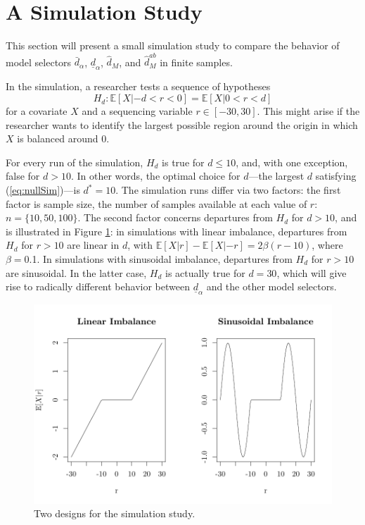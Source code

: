 \documentclass[12pt]{article}\usepackage[]{graphicx}\usepackage[]{color}
\makeatletter
\def\maxwidth{ %
  \ifdim\Gin@nat@width>\linewidth
    \linewidth
  \else
    \Gin@nat@width
  \fi
}
\newcommand{\dalphaU}{\bar{d}_\alpha}
\newcommand{\dalphaB}{\underline{d}_\alpha}
\newcommand{\dstar}{d^*}
\newcommand{\dhatm}{\hat{d}_M}
\newcommand{\dhatmab}{\hat{d}^{ab}_M}
\newcommand{\EE}{\mathbb{E}}
\makeatother
\begin{document}
\section{A Simulation Study}\label{sec:simulation}

This section will present a small simulation study to compare the
behavior of model selectors $\dalphaU$, $\dalphaB$,
$\dhatm$, and $\dhatmab$ in finite samples.

In the simulation, a researcher tests a sequence of hypotheses
\begin{equation}\label{eq:nullSim}
H_d: \EE [X|-d<r<0]=\EE [X|0<r<d]
\end{equation}
for a covariate $X$ and a sequencing variable $r\in [-30,30]$.
This might arise if the researcher wants to identify the largest
possible region around the origin in which $X$ is balanced around 0.

For every run of the simulation, $H_d$ is true for $d\le 10$, and,
with one exception, false for $d>10$.
In other words, the optimal choice for $d$---the largest $d$
satisfying (\ref{eq:nullSim})---is $\dstar=10$.
The simulation runs differ via two factors: the first factor is sample
size, the number of samples available at each value of $r$:
$n=\{10,50,100\}$.
The second factor concerns departures from $H_d$ for $d>10$, and is
illustrated in Figure \ref{fig:illustrateSim}: in simulations with
linear imbalance, departures from $H_d$ for $r>10$ are linear in $d$, with $\EE
[X|r]-\EE[X|-r]=2\beta(r-10)$, where $\beta=$0.1.
In simulations with sinusoidal imbalance, departures from $H_d$ for
$r>10$ are sinusoidal.
In the latter case, $H_d$ is actually true for $d=30$, which will give
rise to radically different behavior between $\dalphaB$ and the other
model selectors.
\begin{figure}

\includegraphics[width=\maxwidth]{figure/illlustrateSim-1} 

\caption{Two designs for the simulation study.}
\label{fig:illustrateSim}
\end{figure}
\end{document}
